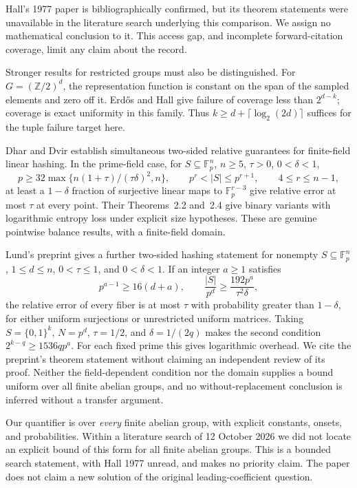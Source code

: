 \documentclass[11pt]{amsart}
\theoremstyle{remark}
\newcommand{\Z}{\mathbb Z}
\newcommand{\F}{\mathbb F}
\begin{document}
Hall's 1977 paper \cite{Hall77} is bibliographically confirmed, but its
theorem statements were unavailable in the literature search underlying
this comparison. We assign no mathematical conclusion to it. This
access gap, and incomplete forward-citation coverage, limit any claim
about the record.

Stronger results for restricted groups must also be distinguished.
For $G=(\Z/2)^d$, the representation function is constant on the
span of the sampled elements and zero off it. Erd\H{o}s and Hall
\cite[p.~449, Theorem 3 and preceding paragraph]{EH78} give failure
of coverage less than $2^{d-k}$; coverage is exact uniformity in this
family. Thus $k\ge d+\lceil\log_2(2d)\rceil$ suffices for the tuple
failure target here.

Dhar and Dvir \cite[Theorem 2.1]{DD24} establish simultaneous two-sided
relative guarantees for finite-field linear hashing. In the prime-field
case, for $S\subseteq\F_p^n$, $n\ge5$, $\tau>0$, $0<\delta<1$,
\[
 p\ge32\max\{n(1+\tau)/(\tau\delta)^2,n\},\qquad
 p^r<|S|\le p^{r+1},\qquad4\le r\le n-1,
\]
at least a $1-\delta$ fraction of surjective linear maps to
$\F_p^{r-3}$ give relative error at most $\tau$ at every point.
Their Theorems~2.2 and~2.4 give binary variants with logarithmic
entropy loss under explicit size hypotheses. These are genuine
pointwise balance results, with a finite-field domain.

Lund's preprint \cite[Corollary 1.4]{Lund26} gives a further two-sided
hashing statement for nonempty $S\subseteq\F_p^n$, $1\le d\le n$,
$0<\tau\le1$, and $0<\delta<1$. If an integer $a\ge1$ satisfies
\[
 p^{a-1}\ge16(d+a),\qquad
 \frac{|S|}{p^d}\ge\frac{192p^a}{\tau^2\delta},
\]
the relative error of every fiber is at most $\tau$ with probability
greater than $1-\delta$, for either uniform surjections or unrestricted
uniform matrices. Taking $S=\{0,1\}^k$, $N=p^d$, $\tau=1/2$, and
$\delta=1/(2q)$ makes the second condition
$2^{k-q}\ge1536qp^a$. For each fixed prime this gives logarithmic
overhead. We cite the preprint's theorem statement without claiming
an independent review of its proof. Neither the field-dependent
condition nor the domain supplies a bound uniform over all finite
abelian groups, and no without-replacement conclusion is inferred
without a transfer argument.

Our quantifier is over \emph{every} finite abelian group, with explicit
constants, onsets, and probabilities. Within a literature search of
12 October 2026 we did not locate an explicit bound of this form for
all finite abelian groups. This is a bounded search statement, with
Hall 1977 unread, and makes no priority claim. The paper does not claim
a new solution of the original leading-coefficient question.
\end{document}
